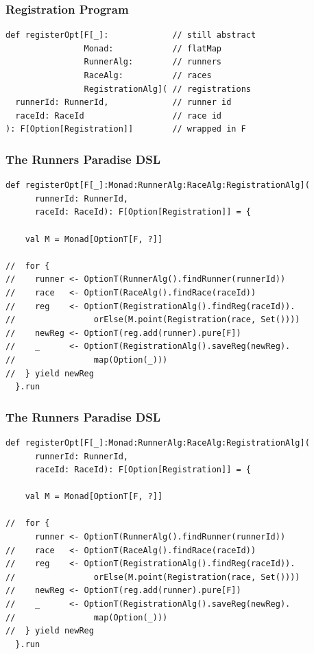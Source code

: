 \documentclass{beamer}
\begin{document}
\begin{frame}[fragile]
  \addtocounter{framenumber}{-1}
  \frametitle{Registration Program}
\begin{verbatim}
def registerOpt[F[_]:             // still abstract
                Monad:            // flatMap
                RunnerAlg:        // runners
                RaceAlg:          // races
                RegistrationAlg]( // registrations
  runnerId: RunnerId,             // runner id
  raceId: RaceId                  // race id
): F[Option[Registration]]        // wrapped in F
\end{verbatim}
\end{frame}

\begin{frame}[fragile]
  \addtocounter{framenumber}{-1}
  \frametitle{The Runners Paradise DSL}
\begin{verbatim}
def registerOpt[F[_]:Monad:RunnerAlg:RaceAlg:RegistrationAlg](
      runnerId: RunnerId,
      raceId: RaceId): F[Option[Registration]] = {

    val M = Monad[OptionT[F, ?]]

//  for {
//    runner <- OptionT(RunnerAlg().findRunner(runnerId))
//    race   <- OptionT(RaceAlg().findRace(raceId))
//    reg    <- OptionT(RegistrationAlg().findReg(raceId)).
//                orElse(M.point(Registration(race, Set())))
//    newReg <- OptionT(reg.add(runner).pure[F])
//    _      <- OptionT(RegistrationAlg().saveReg(newReg).
//                map(Option(_)))
//  } yield newReg
  }.run
\end{verbatim}
\end{frame}

\begin{frame}[fragile]
  \addtocounter{framenumber}{-1}
  \frametitle{The Runners Paradise DSL}
\begin{verbatim}
def registerOpt[F[_]:Monad:RunnerAlg:RaceAlg:RegistrationAlg](
      runnerId: RunnerId,
      raceId: RaceId): F[Option[Registration]] = {

    val M = Monad[OptionT[F, ?]]

//  for {
      runner <- OptionT(RunnerAlg().findRunner(runnerId))
//    race   <- OptionT(RaceAlg().findRace(raceId))
//    reg    <- OptionT(RegistrationAlg().findReg(raceId)).
//                orElse(M.point(Registration(race, Set())))
//    newReg <- OptionT(reg.add(runner).pure[F])
//    _      <- OptionT(RegistrationAlg().saveReg(newReg).
//                map(Option(_)))
//  } yield newReg
  }.run
\end{verbatim}
\end{frame}
\end{document}
